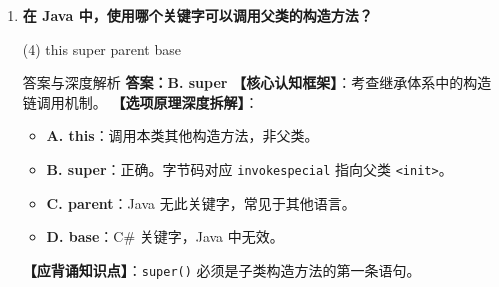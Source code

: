 ﻿\documentclass[12pt, a4paper]{ctexart}
\newcommand{\code}[1]{\texttt{#1}}
\begin{document}
\begin{enumerate}[label=\textbf{\arabic*.}, itemsep=1em]
\begin{bluebox}{答案与深度解析}
		      \textbf{【命题趋势与实战策略】}
		      \begin{itemize}[leftmargin=*, nosep]
			      \item \textbf{考场秒杀}：看到“返回类型 void"直接排除，构造方法连 void 都不能写
			      \item \textbf{高频陷阱}：加了 void 就变成了普通方法，不会在 new 时调用
		      \end{itemize}
	      \end{bluebox}

	\item \textbf{在 Java 中，使用哪个关键字可以调用父类的构造方法？}
	      \begin{tasks}(4)
		      \task this \task super \task parent \task base
	      \end{tasks}
	      \begin{bluebox}{答案与深度解析}
		      \textbf{答案：B. super}
		      \textbf{【核心认知框架】}：考查继承体系中的构造链调用机制。
		      \textbf{【选项原理深度拆解】}：
		      \begin{itemize}[leftmargin=*, nosep]
			      \item \textbf{A. this}：调用本类其他构造方法，非父类。
			      \item \textbf{B. super}：正确。字节码对应 \code{invokespecial} 指向父类 \code{<init>}。
			      \item \textbf{C. parent}：Java 无此关键字，常见于其他语言。
			      \item \textbf{D. base}：C\# 关键字，Java 中无效。
		      \end{itemize}
		      \textbf{【应背诵知识点】}：\code{super()} 必须是子类构造方法的第一条语句。
	      \end{bluebox}


\end{enumerate}
\end{document}

